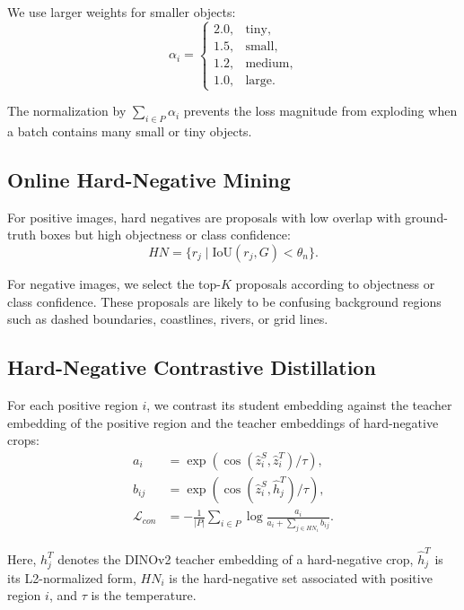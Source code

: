 \documentclass[conference,a4paper]{IEEEtran}
\begin{document}
We use larger weights for smaller objects:
\begin{equation}
\alpha_i =
\begin{cases}
2.0, & \text{tiny},\\
1.5, & \text{small},\\
1.2, & \text{medium},\\
1.0, & \text{large}.
\end{cases}
\end{equation}

The normalization by $\sum_{i \in P}\alpha_i$ prevents the loss magnitude from exploding when a batch contains many small or tiny objects.

\subsection{Online Hard-Negative Mining}

For positive images, hard negatives are proposals with low overlap with ground-truth boxes but high objectness or class confidence:
\begin{equation}
HN = \{r_j \mid \text{IoU}(r_j, G) < \theta_n\}.
\end{equation}

For negative images, we select the top-$K$ proposals according to objectness or class confidence.
These proposals are likely to be confusing background regions such as dashed boundaries, coastlines, rivers, or grid lines.

\subsection{Hard-Negative Contrastive Distillation}

For each positive region $i$, we contrast its student embedding against the teacher embedding of the positive region and the teacher embeddings of hard-negative crops:
\begin{align}
a_i &= \exp\left(\cos(\hat{z}_i^S,\hat{z}_i^T)/\tau\right), \\
b_{ij} &= \exp\left(\cos(\hat{z}_i^S,\hat{h}_j^T)/\tau\right), \\
\mathcal{L}_{con}
&=
-\frac{1}{|P|}
\sum_{i \in P}
\log
\frac{a_i}{a_i + \sum_{j \in HN_i} b_{ij}} .
\label{eq:contrastive_loss}
\end{align}

Here, $h_j^T$ denotes the DINOv2 teacher embedding of a hard-negative crop, $\hat{h}_j^T$ is its L2-normalized form, $HN_i$ is the hard-negative set associated with positive region $i$, and $\tau$ is the temperature.
\end{document}
